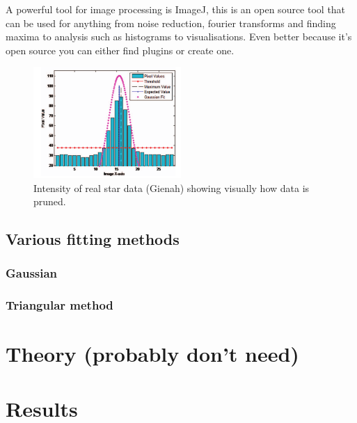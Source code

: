 \documentclass[aps,pra,a4paper,nofootinbib,onecolumn,tightenlines,longbibliography,12pt,amsfonts,amssymb,amsmath,floatfix]{revtex4-2} %
\begin{document}
  A powerful tool for image processing is ImageJ, this is an open source tool
  that can be used for anything from noise reduction, fourier transforms and
  finding maxima to analysis such as histograms to visualisations. 
  Even better because it's open source you can either find plugins or create one.
  \cite{van2019single}
  
    \begin{figure}[H]
      \begin{center}
        \includegraphics[width=0.5\textwidth]{litreview.png}
      \end{center}
      \caption{Intensity of real star data (Gienah) showing visually how data is pruned. \cite{rawashdeh2014image}}
      \label{fig:1}
    \end{figure}
  
  
  \subsection{Various fitting methods} %
  \label{sub:Various fitting methods}
  
    \subsubsection{Gaussian} %
    \label{ssub:Gaussian}
    
    \subsubsection{Triangular method} %
    \label{ssub:Triangular method}
  


\section{Theory (probably don't need)} %
\label{sec:Theory}



\section{Results} %
\label{sec:Results}
\end{document}
